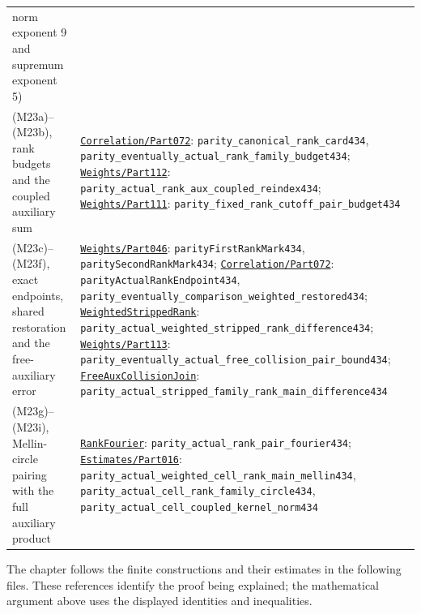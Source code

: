 \begin{longtable}[]{@{}
  >{\raggedright\arraybackslash}p{}
  >{\raggedright\arraybackslash}p{}@{}}
norm exponent 9 and supremum exponent 5) \\
(M23a)--(M23b), rank budgets and the coupled auxiliary sum &
\href{../Green64/Library/Correlation/Part072.lean}{\nolinkurl{Correlation/Part072}}:
{\small\nolinkurl{parity_canonical_rank_card434}},
{\small\nolinkurl{parity_eventually_actual_rank_family_budget434}};
\href{../Green64/Library/Weights/Part112.lean}{\nolinkurl{Weights/Part112}}:
{\small\nolinkurl{parity_actual_rank_aux_coupled_reindex434}};
\href{../Green64/Library/Weights/Part111.lean}{\nolinkurl{Weights/Part111}}:
{\small\nolinkurl{parity_fixed_rank_cutoff_pair_budget434}} \\
(M23c)--(M23f), exact endpoints, shared restoration and the
free-auxiliary error &
\href{../Green64/Library/Weights/Part046.lean}{\nolinkurl{Weights/Part046}}:
{\small\nolinkurl{parityFirstRankMark434}},
{\small\nolinkurl{paritySecondRankMark434}};
\href{../Green64/Library/Correlation/Part072.lean}{\nolinkurl{Correlation/Part072}}:
{\small\nolinkurl{parityActualRankEndpoint434}},
{\small\nolinkurl{parity_eventually_comparison_weighted_restored434}};
\href{../Green64/Library/Weights/WeightedStrippedRank.lean}{\nolinkurl{WeightedStrippedRank}}:
{\small\nolinkurl{parity_actual_weighted_stripped_rank_difference434}};
\href{../Green64/Library/Weights/Part113.lean}{\nolinkurl{Weights/Part113}}:
{\small\nolinkurl{parity_eventually_actual_free_collision_pair_bound434}};
\href{../Green64/Library/Weights/FreeAuxCollisionJoin.lean}{\nolinkurl{FreeAuxCollisionJoin}}:
{\small\nolinkurl{parity_actual_stripped_family_rank_main_difference434}} \\
(M23g)--(M23i), Mellin-circle pairing with the full auxiliary product &
\href{../Green64/Library/Analysis/Estimates/RankFourier.lean}{\nolinkurl{RankFourier}}:
{\small\nolinkurl{parity_actual_rank_pair_fourier434}};
\href{../Green64/Library/Analysis/Estimates/Part016.lean}{\nolinkurl{Estimates/Part016}}:
{\small\nolinkurl{parity_actual_weighted_cell_rank_main_mellin434}},
{\small\nolinkurl{parity_actual_cell_rank_family_circle434}},
{\small\nolinkurl{parity_actual_cell_coupled_kernel_norm434}} \\
\end{longtable}

The chapter follows the finite constructions and their estimates in the
following files. These references identify the proof being explained;
the mathematical argument above uses the displayed identities and
inequalities.


